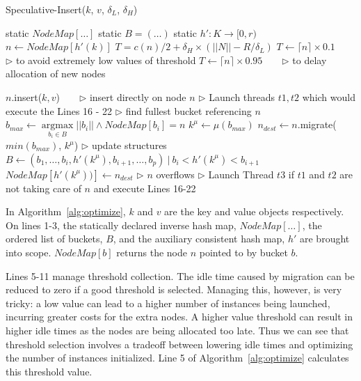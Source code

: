 \begin{algorithm}[htp]
\small
\caption{\label{alg:optimize}Speculative-Insert($k$, $v$, $\delta_L$,
$\delta_H$)} \begin{algorithmic}[1] \STATE static $NodeMap[\ldots]$
\STATE static $B = (\ldots)$
\STATE static $h' : K \rightarrow [0,r)$
\STATE $n \leftarrow NodeMap[h'(k)]$
\STATE $T = c(n)/2 + \delta_H \times (||N|| - R/\delta_L)$
	\STATE $T \leftarrow \lceil{n}\rceil \times 0.1 $\ \ \ \ $\triangleright$ to avoid
	extremely low values of threshold
\ENDIF
{}
	\STATE $T \leftarrow \lceil{n}\rceil \times 0.95$\ \ \ \ $\triangleright$ to delay
	allocation of new nodes
\ENDIF

	\STATE $n$.insert($k,v$)\ \ \ \ $\triangleright$ insert directly on node $n$
	\STATE $\triangleright$ Launch threads $t1,t2$ which would execute the Lines 16 - 22
	\STATE $\triangleright$ find fullest bucket referencing $n$
	\STATE $b_{max} \leftarrow
		\underset{b_i \in B}{\operatorname{argmax}} ||b_i|| \wedge NodeMap[b_i] = n$
	\STATE $k^{\mu} \leftarrow \mu(b_{max})$
	\STATE $n_{dest} \leftarrow n$.migrate($min(b_{max})$, $k^{\mu}$)
	\STATE $\triangleright$ update structures
	\STATE $B \leftarrow (b_1, \ldots, b_i, h'(k^{\mu}), b_{i+1}, \ldots,
	b_p)~|~b_i < h'(k^{\mu}) < b_{i+1}$
	\STATE $NodeMap[h'(k^{\mu}))] \leftarrow n_{dest}$
\ELSE
	\STATE $\triangleright$ $n$ overflows
	\STATE $\triangleright$ Launch Thread $t3$ if $t1$ and $t2$ are not taking care of $n$ and execute Lines 16-22
\ENDIF

\end{algorithmic}
\end{algorithm}

In Algorithm~\ref{alg:optimize}, $k$ and $v$ are the key and value objects
respectively. On lines 1-3, the statically declared inverse hash map,
$NodeMap[\ldots]$, the ordered list of buckets, $B$, and the auxiliary
consistent hash map, $h'$ are brought into scope. $NodeMap[b]$ returns the node
$n$ pointed to by bucket $b$.

Lines 5-11 manage threshold collection. The idle time caused by migration can
be reduced to zero if a good threshold is selected. Managing this, however, is
very tricky: a low value can lead to a higher number of instances being
launched, incurring greater costs for the extra nodes. A higher value threshold
can result in higher idle times as the nodes are being allocated too late. Thus
we can see that threshold selection involves a tradeoff between lowering idle
times and optimizing the number of instances initialized. Line 5 of
Algorithm~\ref{alg:optimize} calculates this threshold value. 

